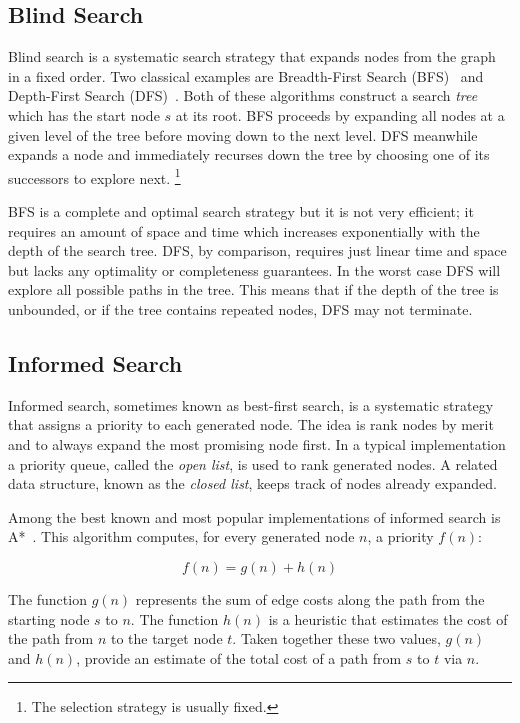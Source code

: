 \subsection{Blind Search}
\label{cha::lit::search::blind}
Blind search is a systematic search strategy that expands nodes from the graph
in a fixed order. Two classical examples are Breadth-First Search
(BFS)~\citep{moore59} and Depth-First Search (DFS)~\citep{russel03}.  Both of
these algorithms construct a search \emph{tree} which has the start node $s$
at its root. BFS proceeds by expanding all nodes at a given level of the tree
before moving down to the next level. DFS meanwhile expands a node and
immediately recurses down the tree by choosing one of its successors to
explore next.  \footnote{The selection strategy is usually fixed.}

BFS is a complete and optimal search strategy but it is not very efficient; it
requires an amount of space and time which increases exponentially with the
depth of the search tree.  DFS, by comparison, requires just linear time and
space but lacks any optimality or completeness guarantees. In the worst case
DFS will explore all possible paths in the tree. This means that if the depth
of the tree is unbounded, or if the tree contains repeated nodes, DFS may not
terminate.

\subsection{Informed Search}
\label{cha::lit::search::informed}
Informed search, sometimes known as best-first search, is a systematic strategy
that assigns a priority to each generated node. The idea is rank nodes by merit 
and to always expand the most promising node first.
In a typical implementation a priority queue, called the 
\emph{open list}, is used to rank generated nodes. A related data structure, 
known as the \emph{closed list}, keeps track of nodes already expanded.

Among the best known and most popular implementations of informed search is 
A{*}~\citep{hart68}. This algorithm computes, for every generated node $n$, a 
priority $f(n)$:

\begin{equation}
f(n) = g(n) + h(n)
\end{equation}

The function $g(n)$ represents the sum of edge costs along the path from the
starting node $s$ to $n$. The function $h(n)$ is a heuristic that estimates the
cost of the path from $n$ to the target node $t$.  Taken together these two
values, $g(n)$ and $h(n)$, provide an estimate of the total cost of a path from
$s$ to $t$ via $n$.  

